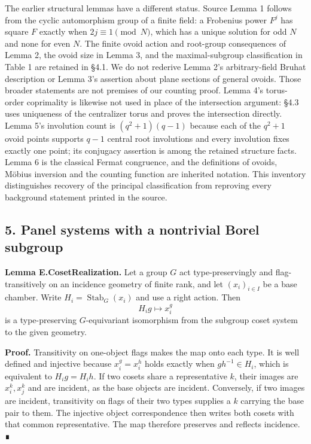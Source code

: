 \documentclass[
  11pt,
  a4paper,
]{article}
\newcounter{none} %
\begin{document}
The earlier structural lemmas have a different status. Source Lemma 1
follows from the cyclic automorphism group of a finite field: a
Frobenius power \(F^j\) has square \(F\) exactly when
\(2j\equiv1\pmod N\), which has a unique solution for odd \(N\) and none
for even \(N\). The finite ovoid action and root-group consequences of
Lemma 2, the ovoid size in Lemma 3, and the maximal-subgroup
classification in Table 1 are retained in §4.1. We do not rederive Lemma
2's arbitrary-field Bruhat description or Lemma 3's assertion about
plane sections of general ovoids. Those broader statements are not
premises of our counting proof. Lemma 4's torus-order coprimality is
likewise not used in place of the intersection argument: §4.3 uses
uniqueness of the centralizer torus and proves the intersection
directly. Lemma 5's involution count is \((q^2+1)(q-1)\) because each of
the \(q^2+1\) ovoid points supports \(q-1\) central root involutions and
every involution fixes exactly one point; its conjugacy assertion is
among the retained structure facts. Lemma 6 is the classical Fermat
congruence, and the definitions of ovoids, Möbius inversion and the
counting function are inherited notation. This inventory distinguishes
recovery of the principal classification from reproving every background
statement printed in the source.

\subsection{5. Panel systems with a nontrivial Borel
subgroup}\label{panel-systems-with-a-nontrivial-borel-subgroup}

\textbf{Lemma E.CosetRealization.} Let a group \(G\) act
type-preservingly and flag-transitively on an incidence geometry of
finite rank, and let \((x_i)_{i\in I}\) be a base chamber. Write
\(H_i=\operatorname{Stab}_G(x_i)\) and use a right action. Then \[
H_i g\longmapsto x_i^g
\] is a type-preserving \(G\)-equivariant isomorphism from the subgroup
coset system to the given geometry.

\textbf{Proof.} Transitivity on one-object flags makes the map onto each
type. It is well defined and injective because \(x_i^g=x_i^h\) holds
exactly when \(gh^{-1}\in H_i\), which is equivalent to \(H_i g=H_i h\).
If two cosets share a representative \(k\), their images are
\(x_i^k,x_j^k\) and are incident, as the base objects are incident.
Conversely, if two images are incident, transitivity on flags of their
two types supplies a \(k\) carrying the base pair to them. The injective
object correspondence then writes both cosets with that common
representative. The map therefore preserves and reflects incidence. ∎
\end{document}
